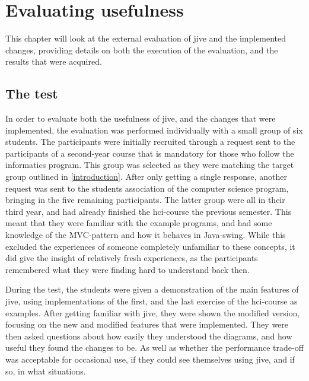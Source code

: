 \chapter{Evaluating usefulness}\label{jiveEval}

This chapter will look at the external evaluation of \gls{jive} and the implemented changes, providing details on both the execution of the evaluation, and the results that were acquired.

\section{The test}\label{jiveEvalTest}
In order to evaluate both the usefulness of \gls{jive}, and the changes that were implemented, the evaluation was performed individually with a small group of six students.
The participants were initially recruited through a request sent to the participants of a second-year course that is mandatory for those who follow the informatics program.
This group was selected as they were matching the target group outlined in \cref{introduction}.
After only getting a single response, another request  was sent to the students association of the computer science program, bringing in the five remaining participants.
The latter group were all in their third year, and had already finished the \gls{hci}-course the previous semester.
This meant that they were familiar with the example programs, and had some knowledge of the MVC-pattern and how it behaves in Java-swing.
While this excluded the experiences of someone completely unfamiliar to these concepts, it did give the insight of relatively fresh experiences, as the participants remembered what they were finding hard to understand back then.

During the test, the students were given a demonstration of the main features of \gls{jive}, using implementations of the first, and the last exercise of the \gls{hci}-course as examples.
After getting familiar with \gls{jive}, they were shown the modified version, focusing on the new and modified features that were implemented.
They were then asked questions about how easily they understood the diagrams, and how useful they found the changes to be.
As well as whether the performance trade-off was acceptable for occasional use, if they could see themselves using \gls{jive}, and if so, in what situations.


